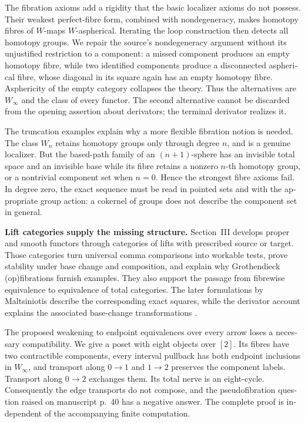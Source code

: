 \begin{otherlanguage}{english}
\begin{otherlanguage}{english}
The fibration axioms add a rigidity that the basic localizer axioms do not possess. Their weakest perfect-fibre form, combined with nondegeneracy, makes homotopy fibres of \(W\)-maps \(W\)-aspherical. Iterating the loop construction then detects all homotopy groups. We repair the source's nondegeneracy argument without its unjustified restriction to a component: a missed component produces an empty homotopy fibre, while two identified components produce a disconnected aspherical fibre, whose diagonal in its square again has an empty homotopy fibre. Asphericity of the empty category collapses the theory. Thus the alternatives are \(W_\infty\) and the class of every functor. The second alternative cannot be discarded from the opening assertion about derivators; the terminal derivator realizes it.

The truncation examples explain why a more flexible fibration notion is needed. The class \(W_n\) retains homotopy groups only through degree \(n\), and is a genuine localizer. But the based-path family of an \((n+1)\)-sphere has an invisible total space and an invisible base while its fibre retains a nonzero \(n\)-th homotopy group, or a nontrivial component set when \(n=0\). Hence the strongest fibre axioms fail. In degree zero, the exact sequence must be read in pointed sets and with the appropriate group action: a cokernel of groups does not describe the component set in general.

\medskip
\noindent\textbf{Lift categories supply the missing structure.}
Section~III develops proper and smooth functors through categories of lifts with prescribed source or target. Those categories turn universal comma comparisons into workable tests, prove stability under base change and composition, and explain why Grothendieck (op)fibrations furnish examples. They also support the passage from fibrewise equivalence to equivalence of total categories. The later formulations by Maltsiniotis describe the corresponding exact squares, while the derivator account explains the associated base-change transformations \citep{Maltsiniotis2005Asphericite,Maltsiniotis2012Exact,Groth2013}.

The proposed weakening to endpoint equivalences over every arrow loses a necessary compatibility. We give a poset with eight objects over \([2]\). Its fibres have two contractible components, every interval pullback has both endpoint inclusions in \(W_\infty\), and transport along \(0\to1\) and \(1\to2\) preserves the component labels. Transport along \(0\to2\) exchanges them. Its total nerve is an eight-cycle. Consequently the edge transports do not compose, and the pseudofibration question raised on manuscript p.~40 has a negative answer. The complete proof is independent of the accompanying finite computation.


\end{otherlanguage}
\end{otherlanguage}
